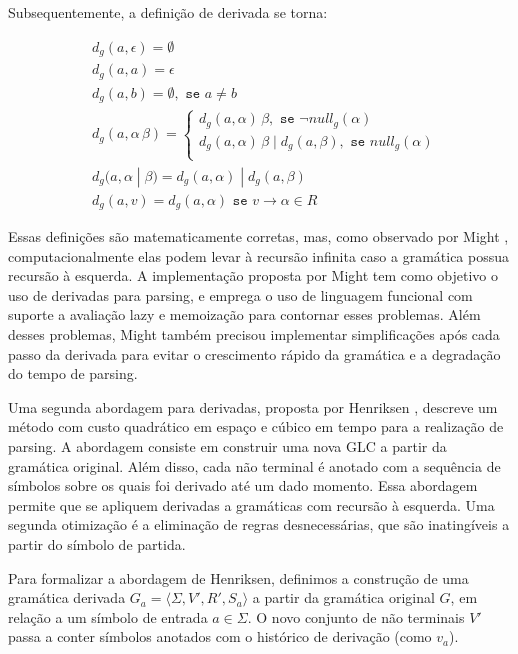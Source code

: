 Subsequentemente, a definição de derivada se torna:

\begin{align*}
    & d_g(a,\epsilon) = \emptyset\\
    & d_g(a,a) = \epsilon\\
    & d_g(a,b) = \emptyset, \texttt{ se } a \neq b \\
    & d_g(a,\alpha \,\beta) = \left\{\begin{array}{l}
                               d_g(a,\alpha)\,\beta, \texttt{ se } \neg null_g(\alpha)\\
                               d_g(a,\alpha)\,\beta \;|\; d_g(a,\beta), \texttt{ se } null_g(\alpha)\\
                          \end{array}\right.\\
    & d_g(a,\alpha\;|\; \beta) = d_g(a,\alpha) \;|\; d_g(a,\beta) \\
    & d_g(a,v) = d_g(a,\alpha) \texttt{ se } v \to \alpha \in R
\end{align*}

Essas definições são matematicamente corretas, mas, como observado por Might \cite{Might2011}, computacionalmente elas podem levar à recursão infinita caso a gramática possua recursão à esquerda. A implementação proposta por Might tem como objetivo o uso de derivadas para parsing, e emprega o uso de linguagem funcional com suporte a avaliação lazy e memoização para contornar esses problemas. Além desses problemas, Might também precisou implementar simplificações após cada passo da derivada para evitar o crescimento rápido da gramática e a degradação do tempo de parsing.

Uma segunda abordagem para derivadas, proposta por Henriksen \cite{Henriksen2019}, descreve um método com custo quadrático em espaço e cúbico em tempo para a realização de parsing. A abordagem consiste em construir uma nova GLC a partir da gramática original. Além disso, cada não terminal é anotado com a sequência de símbolos sobre os quais foi derivado até um dado momento. Essa abordagem permite que se apliquem derivadas a gramáticas com recursão à esquerda. Uma segunda otimização é a eliminação de regras desnecessárias, que são inatingíveis a partir do símbolo de partida.

Para formalizar a abordagem de Henriksen, definimos a construção de uma gramática derivada $G_a = \langle \Sigma, V', R', S_a \rangle$ a partir da gramática original $G$, em relação a um símbolo de entrada $a \in \Sigma$. O novo conjunto de não terminais $V'$ passa a conter símbolos anotados com o histórico de derivação (como $v_a$).

